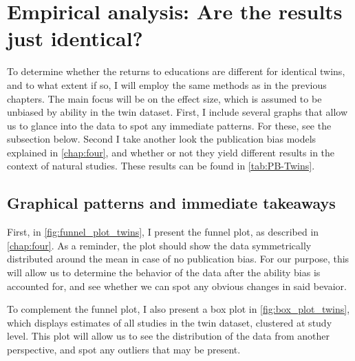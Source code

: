 \section{Empirical analysis: Are the results just identical?}
\label{sec:twins_analysis}

To determine whether the returns to educations are different for identical twins, and to what extent if so, I will employ the same methods as in the previous chapters. The main focus will be on the effect size, which is assumed to be unbiased by ability in the twin dataset. First, I include several graphs that allow us to glance into the data to spot any immediate patterns. For these, see the subsection below. Second I take another look the publication bias models explained in \autoref{chap:four}, and whether or not they yield different results in the context of natural studies. These results can be found in \autoref{tab:PB-Twins}.

\subsection*{Graphical patterns and immediate takeaways}

First, in \autoref{fig:funnel_plot_twins}, I present the funnel plot, as described in \autoref{chap:four}. As a reminder, the plot should show the data symmetrically distributed around the mean in case of no publication bias. For our purpose, this will allow us to determine the behavior of the data after the ability bias is accounted for, and see whether we can spot any obvious changes in said bevaior.

To complement the funnel plot, I also present a box plot in \autoref{fig:box_plot_twins}, which displays estimates of all studies in the twin dataset, clustered at study level. This plot will allow us to see the distribution of the data from another perspective, and spot any outliers that may be present.


